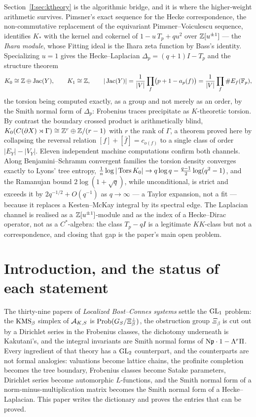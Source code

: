 \begin{chapterabstract}
Section~\ref{I:sec:ktheory} is the algorithmic bridge, and it is where the higher-weight
arithmetic survives. Pimsner's exact sequence for the Hecke correspondence, the
non-commutative replacement of the equivariant Pimsner--Voiculescu sequence, identifies
$K_*$ with the kernel and cokernel of $1-u\,T_p+qu^2$ over $\mathbb{Z}[u^{\pm1}]$ --- the
\emph{Ihara module}, whose Fitting ideal is the Ihara zeta function by Bass's identity.
Specializing $u=1$ gives the Hecke--Laplacian $\Delta_p=(q+1)I-T_p$ and the structure
theorem
\[
K_0\cong\mathbb{Z}\oplus\operatorname{Jac}(Y),\qquad K_1\cong\mathbb{Z},\qquad
|\operatorname{Jac}(Y)|=\frac1{|V|}\prod_f\bigl(p+1-a_p(f)\bigr)=\frac1{|V|}\prod_f\#E_f(\mathbb{F}_p),
\]
the torsion being computed exactly, as a group and not merely as an order, by the Smith
normal form of $\Delta_p$: Frobenius traces precipitate as $K$-theoretic torsion. By
contrast the boundary crossed product is arithmetically blind,
$K_0(C(\partial X)\rtimes\Gamma)\cong\mathbb{Z}^r\oplus\mathbb{Z}/(r-1)$ with $r$ the rank of $\Gamma$,
a theorem proved here by collapsing the reversal relation
$[f]+[\bar f]=c_{o(f)}$ to a single class of order $|E_Y|-|V_Y|$. Eleven independent
machine computations confirm both channels. Along Benjamini--Schramm convergent families
the torsion density converges exactly to Lyons' tree entropy,
$\frac1n\log|\operatorname{Tors} K_0|\to q\log q-\frac{q-1}2\log(q^2-1)$, and the Ramanujan bound
$2\log(1+\sqrt q)$, while unconditional, is strict and exceeds it by
$2q^{-1/2}+O(q^{-1})$ as $q\to\infty$ --- a Taylor expansion, not a fit --- because it
replaces a Kesten--McKay integral by its spectral edge. The Laplacian channel is realised as a
$\mathbb{Z}[u^{\pm1}]$-module and as the index of a Hecke--Dirac operator, not as a
$C^*$-algebra: the class $T_p-qI$ is a legitimate $KK$-class but not a correspondence,
and closing that gap is the paper's main open problem.
\end{chapterabstract}

\section*{Introduction, and the status of each statement}

The thirty-nine papers of \emph{Localized Bost--Connes systems} settle the
$\mathrm{GL}_1$ problem: the $\mathrm{KMS}_\beta$ simplex of $\mathcal{A}_{K,S}$ is $\operatorname{Prob}(G_S/\Xi_\beta^\perp)$,
the obstruction group $\Xi_\beta$ is cut out by a Dirichlet series in the Frobenius
classes, the dichotomy underneath is Kakutani's, and the integral invariants are Smith
normal forms of $\mathrm{N}\mathfrak{p}\cdot 1-\Lambda^r\Pi$. Every ingredient of that theory has a
$\mathrm{GL}_2$ counterpart, and the counterparts are not formal analogies: valuations become
lattice chains, the profinite completion becomes the tree boundary, Frobenius classes
become Satake parameters, Dirichlet series become automorphic $L$-functions, and the
Smith normal form of a norm-minus-multiplication matrix becomes the Smith normal form of
a Hecke--Laplacian. This paper writes the dictionary and proves the entries that can be
proved.

